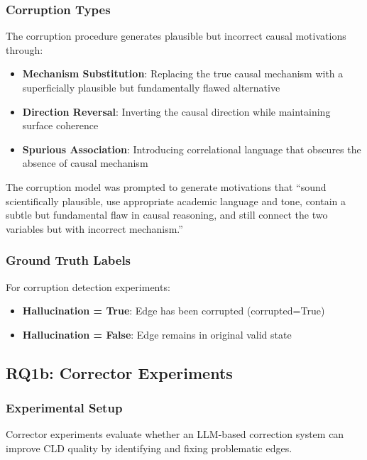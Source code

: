 \documentclass{article}
\begin{document}
\subsubsection{Corruption Types}

The corruption procedure generates plausible but incorrect causal motivations through:
\begin{itemize}
    \item \textbf{Mechanism Substitution}: Replacing the true causal mechanism with a superficially plausible but fundamentally flawed alternative
    \item \textbf{Direction Reversal}: Inverting the causal direction while maintaining surface coherence
    \item \textbf{Spurious Association}: Introducing correlational language that obscures the absence of causal mechanism
\end{itemize}

The corruption model was prompted to generate motivations that ``sound scientifically plausible, use appropriate academic language and tone, contain a subtle but fundamental flaw in causal reasoning, and still connect the two variables but with incorrect mechanism.''

\subsubsection{Ground Truth Labels}

For corruption detection experiments:
\begin{itemize}
    \item \textbf{Hallucination = True}: Edge has been corrupted (corrupted=True)
    \item \textbf{Hallucination = False}: Edge remains in original valid state
\end{itemize}

\subsection{RQ1b: Corrector Experiments}

\subsubsection{Experimental Setup}

Corrector experiments evaluate whether an LLM-based correction system can improve CLD quality by identifying and fixing problematic edges.
\end{document}
